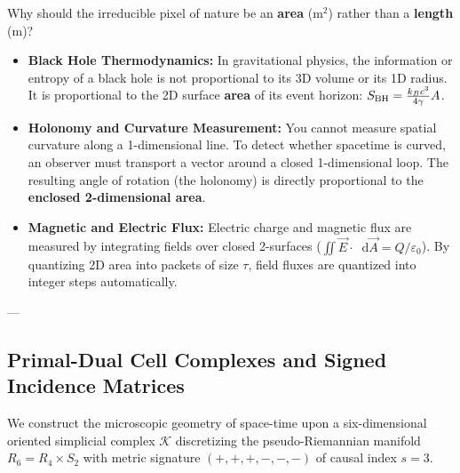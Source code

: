\documentclass[
    12pt,
    a4paper,
    headings=normal,
    twoside=false,
    open=any,
    parskip=half
]{scrbook}
\let\hbar\relax
\newcommand{\diff}{\mathop{}\!\mathrm{d}}
\begin{document}
\begin{intuitionbox}
Why should the irreducible pixel of nature be an \textbf{area} ($\text{m}^2$) rather than a \textbf{length} ($\text{m}$)?
\begin{itemize}[leftmargin=1.5em]
    \item \textbf{Black Hole Thermodynamics:} In gravitational physics, the information or entropy of a black hole is not proportional to its 3D volume or its 1D radius. It is proportional to the 2D surface \textbf{area} of its event horizon: $S_{\text{BH}} = \frac{k_B c^3}{4\gamma\hbar} A$.
    \item \textbf{Holonomy and Curvature Measurement:} You cannot measure spatial curvature along a 1-dimensional line. To detect whether spacetime is curved, an observer must transport a vector around a closed 1-dimensional loop. The resulting angle of rotation (the holonomy) is directly proportional to the \textbf{enclosed 2-dimensional area}.
    \item \textbf{Magnetic and Electric Flux:} Electric charge and magnetic flux are measured by integrating fields over closed 2-surfaces ($\iint \vec{E}\cdot\diff\vec{A} = Q/\varepsilon_0$). By quantizing 2D area into packets of size $\tau$, field fluxes are quantized into integer steps automatically.
\end{itemize}
\end{intuitionbox}

---

\subsection{Primal-Dual Cell Complexes and Signed Incidence Matrices}

We construct the microscopic geometry of space-time upon a six-dimensional oriented simplicial complex $\mathcal{K}$ discretizing the pseudo-Riemannian manifold $R_6 = R_4 \times S_2$ with metric signature $(+,+,+,-,-,-)$ of causal index $s = 3$.
\end{document}
